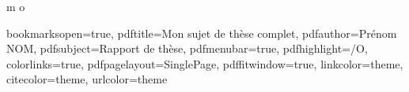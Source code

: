 \usepackage{comment}
\usepackage{lineno}
\linenumbers

\makeatletter \renewcommand\d[1]{\ensuremath{%
		\;\mathrm{d}#1\@ifnextchar\d{\!}{}}}
\makeatother

\def\onedot{$\mathsurround0pt\ldotp$}
\def\cddot{%
	\mathbin{\vcenter{\baselineskip.67ex
			\hbox{\onedot}\hbox{\onedot}}%
}}


\setcounter{DefaultLines}{3}
\setlength{\DefaultFindent}{0.5em}
\setlength{\DefaultNindent}{0em}
\renewcommand{\LettrineFontHook}{\usefont{U}{yinit}{m}{n}}
\renewcommand{\DefaultLoversize}{-0.65}



\usetikzlibrary{plotmarks}
\usepackage{pdfpages}

\usepackage{xparse}
\usepackage{tikz}
\usetikzlibrary{shapes.geometric,calc}
\DeclareDocumentCommand \circled
{ m o }{
}


\usepackage[strict]{changepage}
\newcommand\BackgroundPic{
\put(0,0){
\parbox[b][\paperheight]{\paperwidth}{%
\vfill
\centering
\texttt{[image: images/background-eps-converted-to]}%
\vfill
}}}

\usepackage{color}

\hypersetup
{
bookmarksopen=true,
pdftitle={Mon sujet de thèse complet},
pdfauthor={Prénom NOM},
pdfsubject={Rapport de thèse},
pdfmenubar=true,
pdfhighlight=/O,
colorlinks=true,
pdfpagelayout=SinglePage,
pdffitwindow=true,
linkcolor=theme,
citecolor=theme,
urlcolor=theme
}



\usepackage{fancyhdr}
\pagestyle{fancy}
\fancyfoot[LE,RO]{}
\fancyfoot[CE,CO]{}
\fancyhead[LE,RO]{\thepage}
\fancyhead[RE]{\color{black}\bfseries\nouppercase{\leftmark}}
\fancyhead[LO]{\color{black}\bfseries\nouppercase{\rightmark}}
\renewcommand{\headrulewidth}{1.5pt}
\renewcommand{\headrule}{\hbox to\headwidth{\color{black}\leaders\hrule height \headrulewidth\hfill}}
\renewcommand{\footrulewidth}{1pt}
\usepackage{afterpage}



